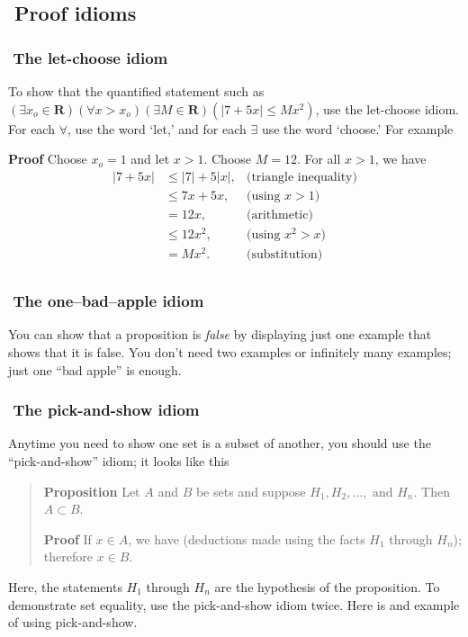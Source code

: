 \documentclass[12pt]{article}
\newcommand{\reals}{\mathbf{R}}
\newcounter{ex}\setcounter{ex}{0}
\newcounter{id}\setcounter{id}{0}
\newcommand{\id}{%
\hspace{-0.2in} \setcounter{id}{\value{id}+1}
\theid \,\,}
\newcounter{se}\setcounter{se}{0}
\newcommand{\se}{%
\hspace{-0.2in} \setcounter{se}{\value{se}+1}
\these \,\,}
\begin{document}
\subsection*{\se Proof idioms}

\subsubsection*{\id The let-choose idiom}

To show that the quantified statement such as \(\left(\exists x_o \in \reals \right) \left(\forall x > x_o\right) 
\left(\exists M \in \reals \right)  \left(|7 + 5 x| \leq M x^2\right)\),
use the let-choose idiom. For each \(\forall\), use the word `let,' and for each \(\exists\) use the word `choose.' For example

\textbf{Proof} Choose \(x_o = 1\) and let \(x > 1\). Choose \(M = 12\). For all \(x > 1\), we have
\begin{align*}
  |7 + 5 x| &\leq |7| + 5 |x|, &\mbox{(triangle inequality)} \\
            &\leq 7 x + 5 x,   &\mbox{(using } x > 1) \\
            &= 12 x,        &\mbox{(arithmetic)} \\
            &\leq 12 x^2,   &\mbox{(using } x^2 > x) \\
            &= M x^2.       &\mbox{(substitution)} \\
\end{align*}



\subsubsection*{\id The one--bad--apple idiom}

You can show that a proposition is {\em false\/} by displaying just
one example that shows that it is false. You don't need two examples
or infinitely many examples; just one ``bad apple'' is enough.  





\subsubsection*{\id The pick-and-show idiom}

Anytime you need to show one set is a subset of another, you should use the
``pick-and-show'' idiom; it looks like this

\begin{quote}

\textbf{Proposition} Let \(A\) and \(B\) be sets and suppose \(H_1, H_2 , \dots
,\mbox{ and } H_n\). Then  \(A \subset B\).

\vspace{0.1in}

\textbf{Proof} If \(x \in A\), we have (deductions made using the 
facts \(H_1\) through \(H_n\)); therefore \(x \in B\).

\end{quote}
Here, the statements \(H_1\) through \(H_n\) are the hypothesis of the
proposition. To demonstrate set equality, use the pick-and-show idiom twice. Here
is and example of using pick-and-show.
\end{document}
